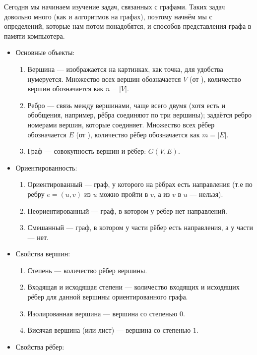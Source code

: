 Сегодня мы начинаем изучение задач, связанных с графами. Таких задач довольно много (как и алгоритмов на графах), поэтому начнём мы с определений, которые нам потом понадобятся, и способов представления графа в памяти компьютера.


\begin{itemize}
    \item Основные объекты:
    \begin{enumerate}
        \item Вершина — изображается на картинках, как точка, для удобства нумеруется. Множество всех вершин обозначается $V$ (от ), количество вершин обозначается как $n = |V|$.
        \item Ребро — связь между вершинами, чаще всего двумя (хотя есть и обобщения, например, рёбра соединяют по три вершины); задаётся ребро номерами вершин, которые соединяет. Множество всех рёбер обозначается $E$ (от ), количество рёбер обозначается как $m = |E|$.
        \item Граф — совокупность вершин и рёбер: $G(V, E)$.
    \end{enumerate}
    \item Ориентированность:
    \begin{enumerate}
        \item Ориентированный — граф, у которого на рёбрах есть направления (т.е по ребру $e = (u, v)$ из $u$ можно пройти в $v$, а из $v$ в $u$ — нельзя).
        \item Неориентированный — граф, в котором у рёбер нет направлений.
        \item Смешанный — граф, в котором у части рёбер есть направления, а у части — нет.
    \end{enumerate}
    \item Свойства вершин:
    \begin{enumerate}
        \item Степень — количество рёбер вершины.
        \item Входящая и исходящая степени — количество входящих и исходящих рёбер для данной вершины ориентированного графа.
        \item Изолированная вершина — вершина со степенью $0$.
        \item Висячая вершина (или лист) — вершина со степенью $1$.
    \end{enumerate}
    \item Свойства рёбер:
    \begin{enumerate}

\end{enumerate}
\end{itemize}
